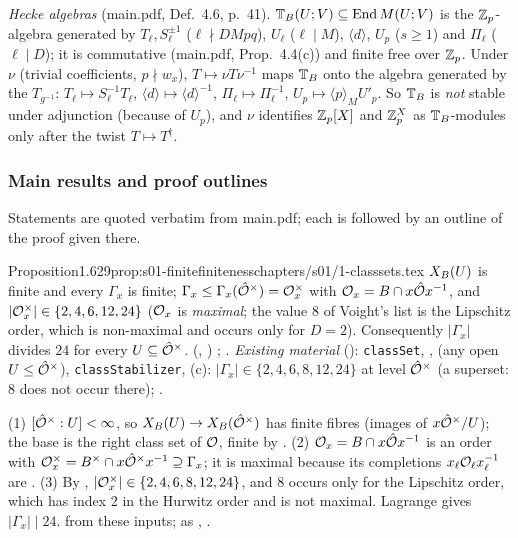 \emph{Hecke algebras} (main.pdf, Def.~4.6, p.~41). $\mathbb{T}_B(U;V)\subseteq\operatorname{End}M(U;V)$ is the $\mathbb{Z}_p$-algebra generated by
$T_\ell,S_\ell^{\pm1}$ ($\ell\nmid DMpq$), $U_\ell$ ($\ell\mid M$), $\langle d\rangle$, $U_p$ ($s\ge1$) and $\Pi_\ell$ ($\ell\mid D$); it is
commutative (main.pdf, Prop.~4.4(c)) and finite free over $\mathbb{Z}_p$. Under $\nu$ (trivial coefficients, $p\nmid w_x$), $T\mapsto\nu T\nu^{-1}$
maps $\mathbb{T}_B$ onto the algebra generated by the $T_{g^{-1}}$: $T_\ell\mapsto S_\ell^{-1}T_\ell$, $\langle d\rangle\mapsto\langle d\rangle^{-1}$,
$\Pi_\ell\mapsto\Pi_\ell^{-1}$, $U_p\mapsto\langle p\rangle_MU'_p$. So $\mathbb{T}_B$ is \emph{not} stable under adjunction (because of $U_p$), and
$\nu$ identifies $\mathbb{Z}_p[X]$ and $\mathbb{Z}_p^X$ as $\mathbb{T}_B$-modules only after the twist $T\mapsto T^\dagger$. \stproved{}

\subsubsection*{Main results and proof outlines}
Statements are quoted verbatim from main.pdf; each is followed by an outline of the proof given there.

\begin{quoted}{Proposition}{1.6}{29}{prop:s01-finite}{finiteness}{chapters/s01/1-classsets.tex}\label{rpt:prop:s01-finite}
$X_B(U)$ is finite and every $\Gamma_x$ is finite; $\Gamma_x\le\Gamma_x(\hat{\mathcal{O}}^\times)=\mathcal{O}_x^\times$ with $\mathcal{O}_x=B\cap x\hat{\mathcal{O}} x^{-1}$,
and $|\mathcal{O}_x^\times|\in\{2,4,6,12,24\}$ ($\mathcal{O}_x$ is \emph{maximal}; the value $8$ of Voight's list is the Lipschitz order,
which is non-maximal and occurs only for $D=2$). Consequently $|\Gamma_x|$ divides $24$ for every $U\subseteq\hat{\mathcal{O}}^\times$.
\stknown{} \stformal{} (, ) \cite[Thm.~17.1.1, p.~278 (finiteness); Thm.~11.5.14, p.~176
(unit groups of definite orders over $\Q$)]{Vo}; \cite[Prop.~4.3, p.~69]{Gr99}.
\emph{Existing material} (\stformal):  \texttt{classSet}, ,
 (any open $U\le\hat{\mathcal{O}}^\times$), \texttt{classStabilizer}, 
(c): $|\Gamma_x|\in\{2,4,6,8,12,24\}$ at level $\hat{\mathcal{O}}^\times$ (a superset: $8$ does not occur there);  .
\end{quoted}
\begin{outline}
(1) $[\hat{\mathcal{O}}^\times:U]<\infty$, so $X_B(U)\to X_B(\hat{\mathcal{O}}^\times)$ has finite fibres (images of $x\hat{\mathcal{O}}^\times/U$); the base is the right
class set of $\mathcal{O}$, finite by \cite[Thm.~17.1.1]{Vo} \stcited.
(2) $\mathcal{O}_x=B\cap x\hat{\mathcal{O}} x^{-1}$ is an order with $\mathcal{O}_x^\times=B^\times\cap x\hat{\mathcal{O}}^\times x^{-1}\supseteq\Gamma_x$; it is maximal because
its completions $x_\ell\mathcal{O}_\ell x_\ell^{-1}$ are \cite[Thm.~9.4.9]{Vo} \stcited.
(3) By \cite[Thm.~11.5.14]{Vo} \stcited, $|\mathcal{O}_x^\times|\in\{2,4,6,8,12,24\}$, and $8$ occurs only for the Lipschitz order, which
has index $2$ in the Hurwitz order and is not maximal. Lagrange gives $|\Gamma_x|\mid24$. \stproved{} from these inputs;
\stformal{} as , .
\end{outline}

